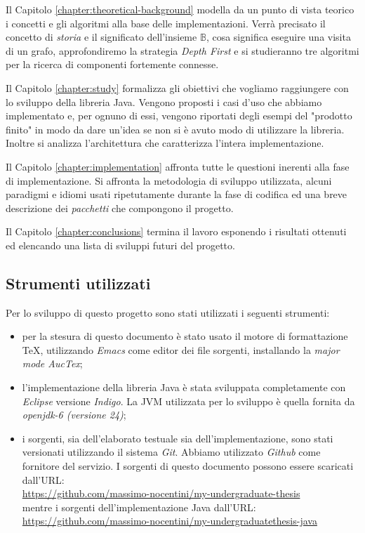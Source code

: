Il Capitolo \ref{chapter:theoretical-background} modella da un punto
di vista teorico i concetti e gli algoritmi alla base delle
implementazioni. Verr\`a precisato il concetto di \emph{storia} e il
significato dell'insieme $\mathbb{B}$, cosa significa eseguire una
visita di un grafo, approfondiremo la strategia \emph{Depth First} e
si studieranno tre algoritmi per la ricerca di componenti fortemente
connesse.

Il Capitolo \ref{chapter:study} formalizza gli obiettivi che vogliamo
raggiungere con lo sviluppo della libreria Java. Vengono proposti i
casi d'uso che abbiamo implementato e, per ognuno di essi, vengono
riportati degli esempi del "prodotto finito" in modo da dare un'idea
se non si \`e avuto modo di utilizzare la libreria. Inoltre si
analizza l'architettura che caratterizza l'intera implementazione.

Il Capitolo \ref{chapter:implementation} affronta tutte le questioni
inerenti alla fase di implementazione. Si affronta la metodologia di
sviluppo utilizzata, alcuni paradigmi e idiomi usati ripetutamente
durante la fase di codifica ed una breve descrizione dei
\emph{pacchetti} che compongono il progetto.

Il Capitolo \ref{chapter:conclusions} termina il lavoro esponendo i
risultati ottenuti ed elencando una lista di sviluppi futuri del
progetto.

\subsection{Strumenti utilizzati}
Per lo sviluppo di questo progetto sono stati utilizzati i seguenti
strumenti:
\begin{itemize}
\item per la stesura di questo documento \`e stato usato il motore di
  formattazione \TeX, utilizzando \emph{Emacs} come editor dei file
  sorgenti, installando la \emph{major mode AucTex};
\item l'implementazione della libreria Java \`e stata sviluppata
  completamente con \emph{Eclipse} versione \emph{Indigo}. La JVM
  utilizzata per lo sviluppo \`e quella fornita da \emph{openjdk-6
    (versione 24)};
\item i sorgenti, sia dell'elaborato testuale sia
  dell'implementazione, sono stati versionati utilizzando il sistema
  \emph{Git}. Abbiamo utilizzato \emph{Github} come fornitore del
  servizio. I sorgenti di questo documento possono essere scaricati
  dall'URL:\\
  \href{https://github.com/massimo-nocentini/my-undergraduate-thesis}{
    https://github.com/massimo-nocentini/my-undergraduate-thesis}\\
  mentre i sorgenti dell'implementazione Java dall'URL:\\
  \href{https://github.com/massimo-nocentini/my-undergraduatethesis-java}{
    https://github.com/massimo-nocentini/my-undergraduatethesis-java}
\end{itemize}
